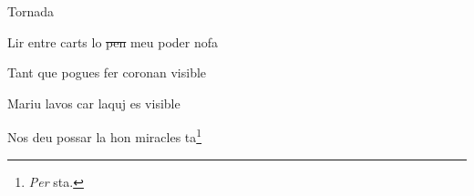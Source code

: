 \documentclass[12pt]{article}
\begin{document}
\begin{estrofaExtra}%




\begin{tornada}

\textsection{}Tornada

\end{tornada}


\end{estrofaExtra}


\begin{estrofa}

 Lir entre carts lo \sout{pen} meu poder nofa

 Tant que pogues fer coronan visible

 Mariu lavos car laquj es visible

 Nos deu possar la hon miracles ta\footnote{\textit{Per} sta.}

\end{estrofa}
\end{document}
